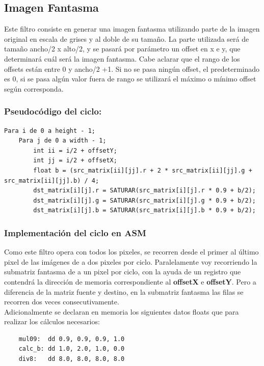 \subsection{Imagen Fantasma}
Este filtro consiste en generar una imagen fantasma utilizando parte de la imagen original en escala de grises y al doble de su tamaño. La parte utilizada será de tamaño ancho/2 x alto/2, y se pasará por parámetro un offset en x e y, que determinará cuál será la imagen fantasma. Cabe aclarar que el rango de los offsets están entre 0 y ancho/2 +1. Si no se pasa ningún offset, el predeterminado es 0, si se pasa algún valor fuera de rango se utilizará el máximo o mínimo offset según corresponda.

\subsubsection{Pseudocódigo del ciclo:}
\begin{codesnippet}
\begin{verbatim}
Para i de 0 a height - 1;
    Para j de 0 a width - 1; 
        int ii = i/2 + offsetY;
        int jj = i/2 + offsetX;
        float b = (src_matrix[ii][jj].r + 2 * src_matrix[ii][jj].g + src_matrix[ii][jj].b) / 4;
        dst_matrix[i][j].r = SATURAR(src_matrix[i][j].r * 0.9 + b/2);
        dst_matrix[i][j].g = SATURAR(src_matrix[i][j].g * 0.9 + b/2);
        dst_matrix[i][j].b = SATURAR(src_matrix[i][j].b * 0.9 + b/2);
\end{verbatim}
\end{codesnippet}

\subsubsection{Implementación del ciclo en ASM}
Como este filtro opera con todos los pixeles, se recorren desde el primer al último pixel de las imágenes de a dos pixeles por ciclo. Paralelamente voy recorriendo la submatriz fantasma de a un pixel por ciclo, con la ayuda de un registro que contendrá la dirección de memoria correspondiente al \textbf{offsetX} e \textbf{offsetY}. 
Pero a diferencia de la matriz fuente y destino, en la submatriz fantasma las filas se recorren dos veces consecutivamente. \\
Adicionalmente se declaran en memoria los siguientes datos floats que para realizar los cálculos necesarios: 
\begin{codesnippet}
\begin{verbatim}   
    mul09:  dd 0.9, 0.9, 0.9, 1.0 
    calc_b: dd 1.0, 2.0, 1.0, 0.0 
    div8:   dd 8.0, 8.0, 8.0, 8.0 
\end{verbatim}
\end{codesnippet}

